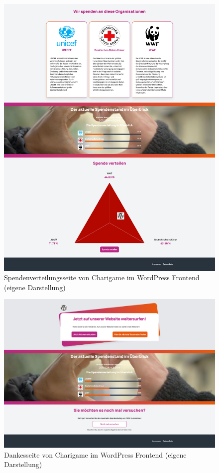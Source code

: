 \documentclass[
	ngerman,
	BCOR=8mm,
	headings=normal,
	parskip=half,
	headsepline,
	automark,
	listof=totoc,
	bibliography=totoc,
]{scrreprt}
\begin{document}
\begin{figure}[H]
    \centering
    \includegraphics[width=1\textwidth]{images/legacy_verteilung_frontend}
    \caption{Spendenverteilungsseite von Charigame im WordPress Frontend (eigene Darstellung)}
    \label{fig:distribution-frontend-legacy}
\end{figure}

\begin{figure}[H]
    \centering
    \includegraphics[width=1\textwidth]{images/legacy_dankesseite_frontend}
    \caption{Dankesseite von Charigame im WordPress Frontend (eigene Darstellung)}
    \label{fig:dankesseite-frontend-legacy}
\end{figure}

%

%
%
\end{document}
